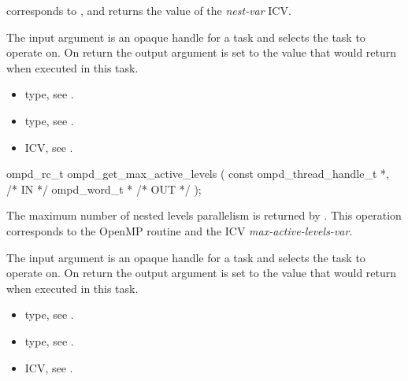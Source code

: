 \descr
{} corresponds to ,
and returns the value of the \emph{nest-var} ICV.

\argdesc
The input argument  is an opaque handle for a task and selects the task to operate on.
On return the output argument  is set to the value that  would return when
executed in this task.

\crossreferences
\begin{itemize}
	\item {} type, see .
	\item {} type, see .
	\item {} ICV, see .
\end{itemize}


\summary

\format
\cspecificstart
\begin{boxedcode}
ompd\_rc\_t ompd\_get\_max\_active\_levels (
  const ompd\_thread\_handle\_t  *,                       /* IN */
  ompd\_word\_t                *                                 /* OUT */
);
\end{boxedcode}
\cspecificend

\descr
The maximum number of nested levels parallelism is returned by
.
This operation corresponds to the OpenMP routine
and the ICV \emph{max-active-levels-var}.%

\argdesc
The input argument  is an opaque handle for a task and selects the task to operate on.
On return the output argument  is set to the value that  would return when
executed in this task.

\crossreferences
\begin{itemize}
	\item {} type, see .
	\item {} type, see .
	\item {} ICV, see .
\end{itemize}


%	
%	

